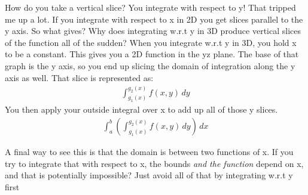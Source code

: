 \documentclass[12pt, letterpaper]{article}
\begin{document}
How do you take a vertical slice? 
You integrate with respect to y!
That tripped me up a lot. If you integrate with respect to x in 2D you get slices parallel to the y axis.
So what gives? Why does integrating w.r.t y in 3D produce vertical slices of the function all of the sudden?
When you integrate w.r.t y in 3D, you hold x to be a constant. This gives you a 2D function in the yz plane.
The base of that graph is the y axis, so you end up slicing the domain of integration along the y axis as well.
That slice is represented as:
\begin{gather*}
    \int_{g_1(x)}^{g_2(x)} f(x, y) \,dy
\end{gather*}
You then apply your outside integral over x to add up all of those y slices.
\begin{gather*}
    \int_a^b\left(\int_{g_1(x)}^{g_2(x)} f(x, y) \,dy\right)\,dx
\end{gather*}

A final way to see this is that the domain is between two functions of x. 
If you try to integrate that with respect to x, the bounds \emph{and the function} depend on x, and that is potentially impossible?
Just avoid all of that by integrating w.r.t y first
\end{document}
